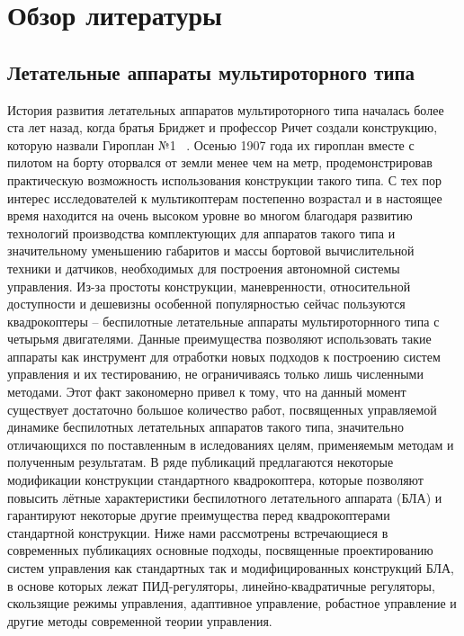 \documentclass[a4paper,14pt,oneside,openany]{memoir}
\date{}
\author{}
\begin{document}
	
	\chapter{Обзор литературы} \label{review}
	
	\section{Летательные аппараты мультироторного типа} \label{review_s1}
	
	История развития летательных аппаратов мультироторного типа началась более ста лет назад, когда братья Бриджет и профессор Ричет создали конструкцию, которую назвали Гироплан №1 ~\cite{Leishman01, Rumerman01}. Осенью 1907 года их гироплан вместе с пилотом на борту оторвался от земли менее чем на метр, продемонстрировав практическую возможность использования конструкции такого типа. С тех пор интерес исследователей к мультикоптерам постепенно возрастал и в настоящее время находится на очень высоком уровне во многом благодаря развитию технологий производства комплектующих для аппаратов такого типа и значительному уменьшению габаритов и массы бортовой вычислительной техники и датчиков, необходимых для построения автономной системы управления. Из-за простоты конструкции, маневренности, относительной доступности и дешевизны особенной популярностью сейчас пользуются квадрокоптеры -- беспилотные летательные аппараты мультироторнного типа с четырьмя двигателями. Данные преимущества позволяют использовать такие аппараты как инструмент для отработки новых подходов к построению систем управления и их тестированию, не ограничиваясь только лишь численными методами. Этот факт закономерно привел к тому, что на данный момент существует достаточно большое количество работ, посвященных управляемой динамике беспилотных летательных аппаратов такого типа, значительно отличающихся по поставленным в иследованиях целям, применяемым методам и полученным результатам. В ряде публикаций предлагаются некоторые модификации конструкции стандартного квадрокоптера, которые позволяют повысить лётные характеристики беспилотного летательного аппарата (БЛА) и гарантируют некоторые другие преимущества перед квадрокоптерами стандартной конструкции. Ниже нами рассмотрены встречающиеся в современных публикациях основные подходы, посвященные проектированию систем управления как стандартных так и модифицированных конструкций БЛА, в основе которых лежат ПИД-регуляторы, линейно-квадратичные регуляторы, скользящие режимы управления, адаптивное управление, робастное управление и другие методы современной теории управления.
\end{document}
